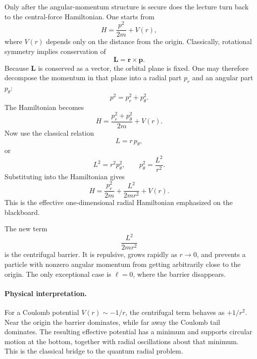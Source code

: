 Only after the angular-momentum structure is secure does the lecture turn back to the central-force Hamiltonian. One starts from
\begin{equation}
H=\frac{p^2}{2m}+V(r),
\end{equation}
where \(V(r)\) depends only on the distance from the origin. Classically, rotational symmetry implies conservation of
\begin{equation}
\mathbf{L}=\mathbf{r}\times\mathbf{p}.
\end{equation}
Because \(\mathbf{L}\) is conserved as a vector, the orbital plane is fixed. One may therefore decompose the momentum in that plane into a radial part \(p_r\) and an angular part \(p_\theta\):
\begin{equation}
p^2=p_r^2+p_\theta^2.
\end{equation}
The Hamiltonian becomes
\begin{equation}
H=\frac{p_r^2+p_\theta^2}{2m}+V(r).
\end{equation}
Now use the classical relation
\begin{equation}
L=r\,p_\theta,
\end{equation}
or
\begin{equation}
L^2=r^2p_\theta^2,\qquad p_\theta^2=\frac{L^2}{r^2}.
\end{equation}
Substituting into the Hamiltonian gives
\begin{equation}
H=\frac{p_r^2}{2m}+\frac{L^2}{2mr^2}+V(r).
\end{equation}
This is the effective one-dimensional radial Hamiltonian emphasized on the blackboard.

The new term
\begin{equation}
\frac{L^2}{2mr^2}
\end{equation}
is the centrifugal barrier. It is repulsive, grows rapidly as \(r\to 0\), and prevents a particle with nonzero angular momentum from getting arbitrarily close to the origin. The only exceptional case is \(\ell=0\), where the barrier disappears.

\paragraph{Physical interpretation.}
For a Coulomb potential \(V(r)\sim -1/r\), the centrifugal term behaves as \(+1/r^2\). Near the origin the barrier dominates, while far away the Coulomb tail dominates. The resulting effective potential has a minimum and supports circular motion at the bottom, together with radial oscillations about that minimum. This is the classical bridge to the quantum radial problem.

